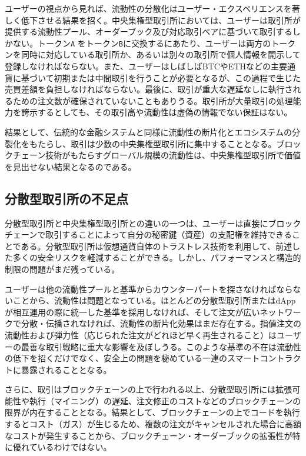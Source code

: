 \documentclass{article}
\begin{document}
\begin{multicols}{2}
ユーザーの視点から見れば、流動性の分散化はユーザー・エクスペリエンスを著しく低下させる結果を招く。中央集権型取引所においては、ユーザーは取引所が提供する流動性プール、オーダーブック及び対応取引ペアに基づいて取引するしかない。トークン\verb|A| をトークン\verb|B|に交換するにあたり、ユーザーは両方のトークンを同時に対応している取引所か、あるいは別々の取引所で個人情報を開示して登録しなければならない。また、ユーザーはしばしばBTCやETHなどの主要通貨に基づいて初期または中間取引を行うことが必要となるが、この過程で生じた売買差額を負担しなければならない。最後に、取引が重大な遅延なしに執行されるための注文数が確保されていないこともありうる。取引所が大量取引の処理能力を誇示するとしても、その取引高や流動性は虚偽の情報でない保証はない\cite{fakevolume}。

結果として、伝統的な金融システムと同様に流動性の断片化とエコシステムの分裂化をもたらし、取引は少数の中央集権型取引所に集中することとなる。ブロックチェーン技術がもたらすグローバル規模の流動性は、中央集権型取引所で価値を見出せない結果となるのである。


\subsection{分散型取引所の不足点}

分散型取引所と中央集権型取引所との違いの一つは、ユーザーは直接にブロックチェーンで取引することによって自分の秘密鍵（資産）の支配権を維持できることである。分散型取引所は仮想通貨自体のトラストレス技術を利用して、前述した多くの安全リスクを軽減することができる。しかし、パフォーマンスと構造的制限の問題がまだ残っている。

ユーザーは他の流動性プールと基準からカウンターパートを探さなければならないことから、流動性は問題となっている。ほとんどの分散型取引所またはdAppが相互運用の際に統一した基準を採用しなければ、そして注文が広いネットワークで分散・伝播されなければ、流動性の断片化効果はまだ存在する。指値注文の流動性および弾力性（応じられた注文がどれほど早く再生されること）はユーザーの最善な取引戦略に重大な影響を及ぼしうる\cite{limitorderliquidity}。このような基準の不在は流動性の低下を招くだけでなく、安全上の問題を秘めている一連のスマートコントラクトに暴露されることとなる。

さらに、取引はブロックチェーンの上で行われる以上、分散型取引所には拡張可能性や執行（マイニング）の遅延、注文修正のコストなどのブロックチェーンの限界が内在することとなる。結果として、ブロックチェーンの上でコードを執行するとコスト（ガス）が生じるため、複数の注文がキャンセルされた場合に高額なコストが発生することから、ブロックチェーン・オーダーブックの拡張性が特に優れているわけではない。


\end{multicols}
\end{document}
